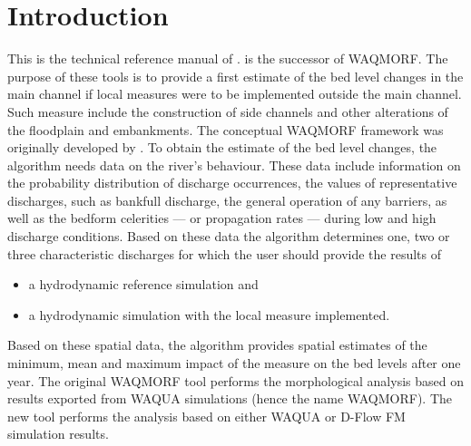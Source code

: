 \chapter{Introduction}

This is the technical reference manual of \dfastmi.
\dfastmi is the successor of WAQMORF.
The purpose of these tools is to provide a first estimate of the bed level changes in the main channel if local measures were to be implemented outside the main channel.
Such measure include the construction of side channels and other alterations of the floodplain and embankments.
The conceptual WAQMORF framework was originally developed by \citep{Sieben2008}.
To obtain the estimate of the bed level changes, the algorithm needs data on the river's behaviour.
These data include information on the probability distribution of discharge occurrences, the values of representative discharges, such as bankfull discharge, the general operation of any barriers, as well as the bedform celerities --- or propagation rates --- during low and high discharge conditions.
Based on these data the algorithm determines one, two or three characteristic discharges for which the user should provide the results of

\begin{itemize}
\item a hydrodynamic reference simulation and
\item a hydrodynamic simulation with the local measure implemented.
\end{itemize}

Based on these spatial data, the algorithm provides spatial estimates of the minimum, mean and maximum impact of the measure on the bed levels after one year.
The original WAQMORF tool performs the morphological analysis based on results exported from WAQUA simulations (hence the name WAQMORF).
The new \dfastmi tool performs the analysis based on either WAQUA or D-Flow FM simulation results.